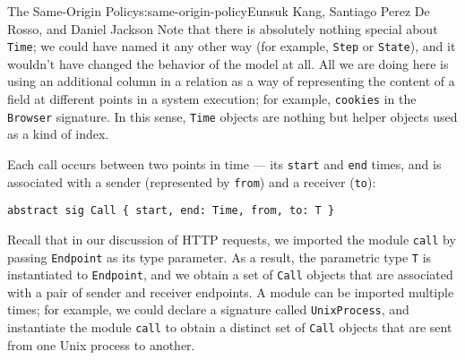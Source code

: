 \begin{aosachapter}{The Same-Origin Policy}{s:same-origin-policy}{Eunsuk Kang, Santiago Perez De Rosso, and Daniel Jackson}
Note that there is absolutely nothing special about \texttt{Time}; we
could have named it any other way (for example, \texttt{Step} or
\texttt{State}), and it wouldn't have changed the behavior of the model
at all. All we are doing here is using an additional column in a
relation as a way of representing the content of a field at different
points in a system execution; for example, \texttt{cookies} in the
\texttt{Browser} signature. In this sense, \texttt{Time} objects are
nothing but helper objects used as a kind of index.

Each call occurs between two points in time --- its \texttt{start} and
\texttt{end} times, and is associated with a sender (represented by
\texttt{from}) and a receiver (\texttt{to}):

\begin{verbatim}
abstract sig Call { start, end: Time, from, to: T } 
\end{verbatim}

Recall that in our discussion of HTTP requests, we imported the module
\texttt{call} by passing \texttt{Endpoint} as its type parameter. As a
result, the parametric type \texttt{T} is instantiated to
\texttt{Endpoint}, and we obtain a set of \texttt{Call} objects that are
associated with a pair of sender and receiver endpoints. A module can be
imported multiple times; for example, we could declare a signature
called \texttt{UnixProcess}, and instantiate the module \texttt{call} to
obtain a distinct set of \texttt{Call} objects that are sent from one
Unix process to another.

\end{aosachapter}
